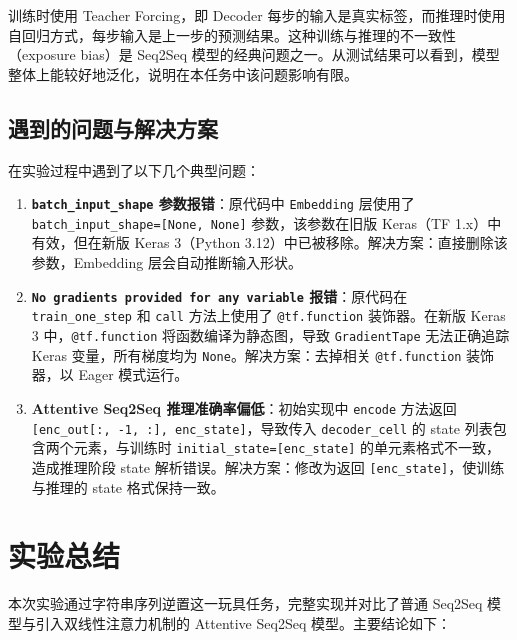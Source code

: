\documentclass[12pt, a4paper]{article}
\begin{document}
训练时使用 Teacher Forcing，即 Decoder 每步的输入是真实标签，而推理时使用自回归方式，每步输入是上一步的预测结果。这种训练与推理的不一致性（exposure bias）是 Seq2Seq 模型的经典问题之一。从测试结果可以看到，模型整体上能较好地泛化，说明在本任务中该问题影响有限。

\subsection{遇到的问题与解决方案}

在实验过程中遇到了以下几个典型问题：

\begin{enumerate}
    \item \textbf{\texttt{batch\_input\_shape} 参数报错}：原代码中 \texttt{Embedding} 层使用了 \texttt{batch\_input\_shape=[None, None]} 参数，该参数在旧版 Keras（TF 1.x）中有效，但在新版 Keras 3（Python 3.12）中已被移除。解决方案：直接删除该参数，Embedding 层会自动推断输入形状。

    \item \textbf{\texttt{No gradients provided for any variable} 报错}：原代码在 \texttt{train\_one\_step} 和 \texttt{call} 方法上使用了 \texttt{@tf.function} 装饰器。在新版 Keras 3 中，\texttt{@tf.function} 将函数编译为静态图，导致 \texttt{GradientTape} 无法正确追踪 Keras 变量，所有梯度均为 \texttt{None}。解决方案：去掉相关 \texttt{@tf.function} 装饰器，以 Eager 模式运行。

    \item \textbf{Attentive Seq2Seq 推理准确率偏低}：初始实现中 \texttt{encode} 方法返回 \texttt{[enc\_out[:, -1, :], enc\_state]}，导致传入 \texttt{decoder\_cell} 的 state 列表包含两个元素，与训练时 \texttt{initial\_state=[enc\_state]} 的单元素格式不一致，造成推理阶段 state 解析错误。解决方案：修改为返回 \texttt{[enc\_state]}，使训练与推理的 state 格式保持一致。
\end{enumerate}

\section{实验总结}

本次实验通过字符串序列逆置这一玩具任务，完整实现并对比了普通 Seq2Seq 模型与引入双线性注意力机制的 Attentive Seq2Seq 模型。主要结论如下：
\end{document}
